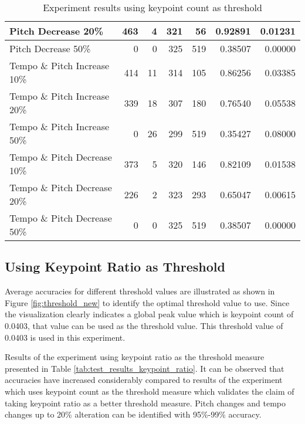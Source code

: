 \begin{table}[H]
\begin{tabular}{|l|r|r|r|r|r|r|}
        Pitch Decrease 20\%                & 463         & 4           & 321         & 56          & 0.92891           & 0.01231          \\ \hline
        Pitch Decrease 50\%                & 0           & 0           & 325         & 519         & 0.38507           & 0.00000          \\ \hline
        Tempo \& Pitch Increase 10\%       & 414         & 11          & 314         & 105         & 0.86256           & 0.03385          \\ \hline
        Tempo \& Pitch Increase 20\%       & 339         & 18          & 307         & 180         & 0.76540           & 0.05538          \\ \hline
        Tempo \& Pitch Increase 50\%       & 0           & 26          & 299         & 519         & 0.35427           & 0.08000          \\ \hline
        Tempo \& Pitch Decrease 10\%       & 373         & 5           & 320         & 146         & 0.82109           & 0.01538          \\ \hline
        Tempo \& Pitch Decrease 20\%       & 226         & 2           & 323         & 293         & 0.65047           & 0.00615          \\ \hline
        Tempo \& Pitch Decrease 50\%       & 0           & 0           & 325         & 519         & 0.38507           & 0.00000          \\ \hline
    \end{tabular}
    \caption{Experiment results using keypoint count as threshold}
    \label{tab:test_results_keypoint}
\end{table}


\subsection{Using Keypoint Ratio as Threshold}

Average accuracies for different threshold values are illustrated as shown in Figure \ref{fig:threshold_new} to identify the optimal threshold value to use. Since
the visualization clearly indicates a global peak value which is keypoint count of 0.0403, that value can be used as the threshold value. This threshold value of 
0.0403 is used in this experiment. 
\vspace{12pt}

Results of the experiment using keypoint ratio as the threshold measure presented in Table \ref{tab:test_results_keypoint_ratio}. It can be observed that accuracies
have increased considerably compared to results of the experiment which uses keypoint count as the threshold measure which validates the claim of taking keypoint ratio as
a better threshold measure. Pitch changes and tempo changes up to 20\% alteration can be identified with 95\%-99\% accuracy.

